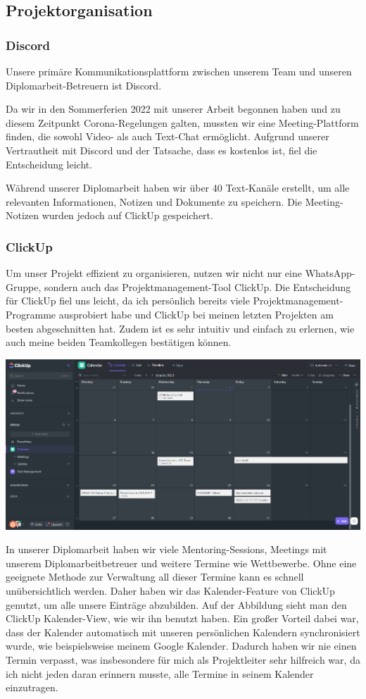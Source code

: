\subsection{Projektorganisation}

\subsubsection{Discord}
Unsere primäre Kommunikationsplattform zwischen unserem Team und unseren Diplomarbeit-Betreuern ist Discord.

Da wir in den Sommerferien 2022 mit unserer Arbeit begonnen
haben und zu diesem Zeitpunkt Corona-Regelungen galten,
mussten wir eine Meeting-Plattform finden, die sowohl Video-
als auch Text-Chat ermöglicht. Aufgrund unserer Vertrautheit
mit Discord und der Tatsache, dass es kostenlos ist, fiel
die Entscheidung leicht.

Während unserer Diplomarbeit haben wir über 40 Text-Kanäle erstellt, um alle relevanten Informationen, Notizen und Dokumente zu speichern. Die Meeting-Notizen wurden jedoch auf ClickUp gespeichert.
\subsubsection{ClickUp}
Um unser Projekt effizient zu organisieren, nutzen wir nicht nur eine WhatsApp-Gruppe, sondern auch das Projektmanagement-Tool ClickUp. Die Entscheidung für ClickUp fiel uns leicht, da ich persönlich bereits viele Projektmanagement-Programme ausprobiert habe und ClickUp bei meinen letzten Projekten am besten abgeschnitten hat. Zudem ist es sehr intuitiv und einfach zu erlernen, wie auch meine beiden Teamkollegen bestätigen können.

\includegraphics[width=1\textwidth]{./pics/clickup-calender-view.png}

In unserer Diplomarbeit haben wir viele Mentoring-Sessions,
Meetings mit unserem Diplomarbeitbetreuer und weitere
Termine wie Wettbewerbe. Ohne eine geeignete Methode zur
Verwaltung all dieser Termine kann es schnell
unübersichtlich werden. Daher haben wir das Kalender-Feature
von ClickUp genutzt, um alle unsere Einträge abzubilden. Auf der Abbildung sieht man den ClickUp Kalender-View, wie wir ihn benutzt haben. Ein großer Vorteil dabei war, dass der Kalender automatisch
mit unseren persönlichen Kalendern synchronisiert wurde, wie
beispielsweise meinem Google Kalender. Dadurch haben wir nie
einen Termin verpasst, was insbesondere für mich als
Projektleiter sehr hilfreich war, da ich nicht jeden daran
erinnern musste, alle Termine in seinem Kalender
einzutragen.

